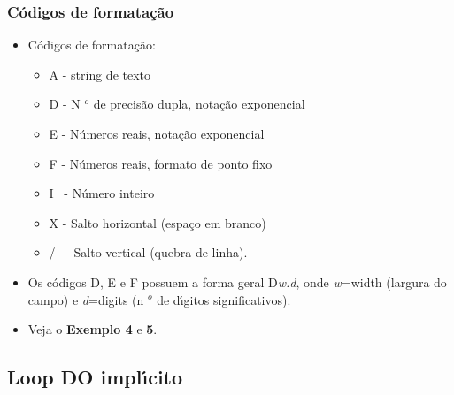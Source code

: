 \documentclass[notes=show]{beamer}
\begin{document}
\begin{frame}%

\frametitle{C\'{o}digos de formata\c{c}\~{a}o}

\begin{itemize}
\item C\'{o}digos de formata\c{c}\~{a}o:

\begin{itemize}
\item A -\TEXTsymbol{>} string de texto

\item D -\TEXTsymbol{>} N%
${{}^o}$
de precis\~{a}o dupla, nota\c{c}\~{a}o exponencial

\item E -\TEXTsymbol{>} N\'{u}meros reais, nota\c{c}\~{a}o exponencial

\item F -\TEXTsymbol{>} N\'{u}meros reais, formato de ponto fixo

\item I \ -\TEXTsymbol{>} N\'{u}mero inteiro

\item X -\TEXTsymbol{>} Salto horizontal (espa\c{c}o em branco)

\item / \ -\TEXTsymbol{>} Salto vertical (quebra de linha).
\end{itemize}

\item Os c\'{o}digos D, E e F possuem a forma geral D\textit{w.d}, onde 
\textit{w}=width (largura do campo) e \textit{d}=digits (n%
${{}^o}$
de d\'{\i}gitos significativos).

\item Veja o \textbf{Exemplo 4 }e \textbf{5}.
\end{itemize}

\transboxout%
\end{frame}%

\subsection{Loop DO impl\'{\i}cito}
\end{document}
